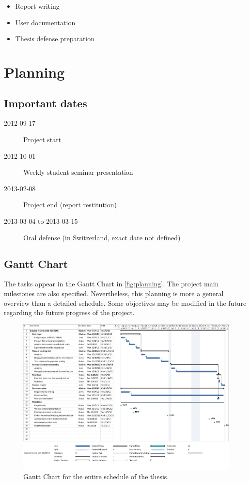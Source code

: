 \begin{itemize}
    \item Report writing
    \item User documentation
    \item Thesis defense preparation
\end{itemize}

\section{Planning}

\subsection{Important dates}

\begin{description}
\item[2012-09-17] Project start
\item[2012-10-01] Weekly student seminar presentation
\item[2013-02-08] Project end (report restitution)
\item[2013-03-04 to 2013-03-15] Oral defense (in Switzerland, exact date not defined)
\end{description}

\subsection{Gantt Chart}
The tasks appear in the Gantt Chart in \autoref{fig:planning}. The project main milestones are also specified. Nevertheless, this planning is more a general overview than a detailed schedule. Some objectives may be modified in the future regarding the future progress of the project.

\begin{landscape}
\begin{figure}[!h]
\centering
\includegraphics[width=0.95\linewidth]{images/planning} 
\caption{Gantt Chart for the entire schedule of the thesis.}
\label{fig:planning}
\end{figure}
\end{landscape}

